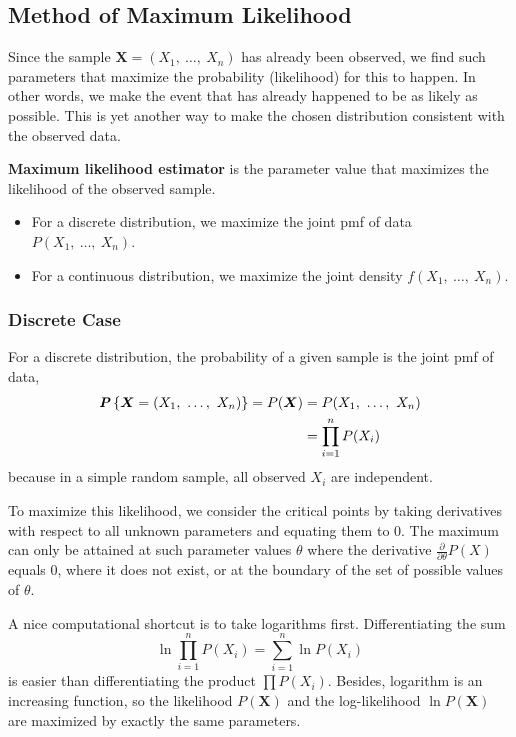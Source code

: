 \subsection{Method of Maximum Likelihood}
\label{subsec:method-of-maximum-likelihood}

Since the sample $\boldsymbol{X} = (X_1,\ \ldots,\ X_n)$ has already been observed, we find such parameters that maximize the probability (likelihood) for this to happen. In other words, we make the event that has already happened to be as likely as possible. This is yet another way to make the chosen distribution consistent with the observed data.
\begin{definition}{}
  \textbf{Maximum likelihood estimator} is the parameter value that maximizes the likelihood of the observed sample.
  \begin{itemize}
    \item For a discrete distribution, we maximize the joint pmf of data $P(X_1,\ \ldots,\ X_n)$.
    \item For a continuous distribution, we maximize the joint density $f(X_1,\ \ldots,\ X_n)$.
  \end{itemize}
\end{definition}

\subsubsection{Discrete Case}
\label{subsubsec:disc-case}

For a discrete distribution, the probability of a given sample is the joint pmf of data,
\begin{align*}
  \textbf{\textit{P}}\left\{\boldsymbol{X} = (X_1,\ \ldots,\ X_n)\right\} = P(\boldsymbol{X}) &= P(X_1,\ \ldots,\ X_n) \\
  &= \prod_{i=1}^{n} P(X_i)
\end{align*}
because in a simple random sample, all observed $X_i$ are independent.

To maximize this likelihood, we consider the critical points by taking derivatives with respect to all unknown parameters and equating them to 0.  The maximum can only be attained at such parameter values $\theta$ where the derivative $\frac{\partial}{\partial\theta} P(X)$ equals 0, where it does not exist, or at the boundary of the set of possible values of $\theta$.

A nice computational shortcut is to take logarithms first. Differentiating the sum
\begin{equation*}
  \ln \prod_{i=1}^{n} P(X_i) = \sum_{i=1}^{n} \ln P(X_i)
\end{equation*}
is easier than differentiating the product $\prod P(X_i)$. Besides, logarithm is an increasing function, so the likelihood $P(\boldsymbol{X})$ and the log-likelihood $\ln P(\boldsymbol{X})$ are maximized by exactly the same parameters.

